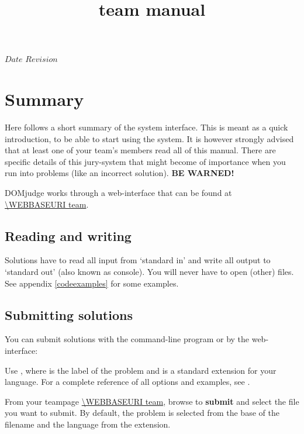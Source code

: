 

\usepackage[english]{babel}

\SVN $Date$
\SVN $Revision$

\title{\DOMjudge team manual}





\section*{Summary}

Here follows a short summary of the system interface. This is meant as
a quick introduction, to be able to start using the system. It is
however strongly advised that at least one of your team's members
read all of this manual. There are specific details of this
jury-system that might become of importance when you run into
problems (like an incorrect solution). \textbf{BE WARNED!}

DOMjudge works through a web-interface that can be found at\\
\url{\WEBBASEURI team}.

\subsection*{Reading and writing}

Solutions have to read all input from `standard in' and write all
output to `standard out' (also known as console). You will never have
to open (other) files. See appendix \ref{codeexamples} for some
examples.

\subsection*{Submitting solutions}

You can submit solutions with the command-line program  or
by the web-interface:
\begin{description}[\breaklabel\setlabelstyle{\bfseries}]
\item[Command-line]
Use , where  is the
label of the problem and  is a standard extension for
your language.  For a complete reference of all options and examples,
see .
\item[Web-interface]
From your teampage \url{\WEBBASEURI team}, browse to
\textbf{submit} and select the file you want to submit. By default,
the problem is selected from the base of the filename and the language
from the extension.
\end{description}

